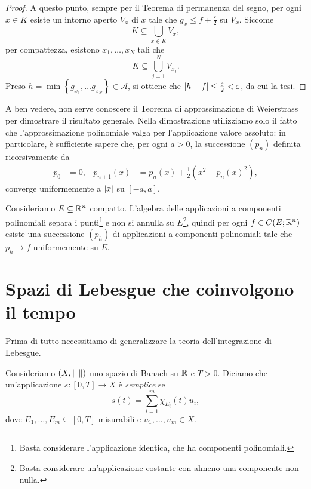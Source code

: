 \begin{proof}
A questo punto, sempre per il Teorema di permanenza del segno, per ogni $x \in K$ esiste un intorno aperto $V_x$ di $x$ tale che $g_x \le f+\frac{\varepsilon}{2}$ su $V_x$. Siccome 
\[ K \subseteq \bigcup_{x \in K} V_x, \]
per compattezza, esistono $x_1,\dots,x_N$ tali che 
\[ K \subseteq \bigcup_{j=1}^N V_{x_j}. \]
Preso $h = \min \left\lbrace g_{x_1},\dots g_{x_N}\right\rbrace \in \overline{\mathcal{A}}$, si ottiene che $\lvert h - f\rvert \le \frac{\varepsilon}{2} <\varepsilon$, da cui la tesi.
\end{proof}

\begin{osservazione}
A ben vedere, non serve conoscere il Teorema di approssimazione di Weierstrass per dimostrare il risultato generale. Nella dimostrazione utilizziamo solo il fatto che l'approssimazione polinomiale valga per l'applicazione valore assoluto: in particolare, è sufficiente sapere che, per ogni $a >0$, la successione $(p_n)$ definita ricorsivamente da 
\begin{align*}
		p_0 &= 0, & p_{n+1}(x) &= p_n(x) + \frac{1}{2}(x^2 -p_n(x)^2),
\end{align*}
converge uniformemente a $\lvert x\rvert$ su $[-a,a]$.
\end{osservazione}

\begin{osservazione}
Consideriamo $E \subseteq \mathbb{R}^n$ compatto. L'algebra delle applicazioni a componenti polinomiali separa i punti\footnote{Basta considerare l'applicazione identica, che ha componenti polinomiali.} e non si annulla su $E$\footnote{Basta considerare un'applicazione costante con almeno una componente non nulla.}, quindi per ogni $f \in C(E; \mathbb{R}^n)$ esiste una successione $(p_h)$ di applicazioni a componenti polinomiali tale che $p_h \to f$ uniformemente su $E$.
\end{osservazione}

\section{Spazi di Lebesgue che coinvolgono il tempo}
Prima di tutto necessitiamo di generalizzare la teoria dell'integrazione di Lebesgue.
\begin{definizione}
Consideriamo $(X,\lVert\;\rVert)$ uno spazio di Banach su $\mathbb{R}$ e $T>0$. Diciamo che un'applicazione $s: [0,T] \to X$ è \emph{semplice} se
\[ s(t) = \sum_{i=1}^{m}\chi_{E_i}(t)u_i,  \]
dove $E_1,\dots,E_m \subseteq [0,T]$ misurabili e $u_1,\dots,u_m \in X$. 
\end{definizione}

